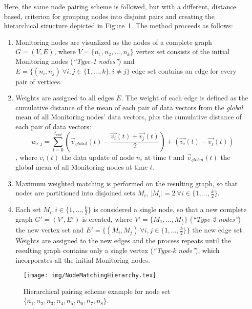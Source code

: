 Here, the same node pairing scheme is followed, but with a different, distance based, criterion for grouping nodes into disjoint pairs and creating the hierarchical structure depicted in Figure~\ref{fig:nodePairHierarchy}. The method proceeds as follows:
\begin{enumerate}
\item Monitoring nodes are visualized as the nodes of a complete graph $G=(V,E)$, where $V=\{n_1, n_2, ... , n_k\}$ vertex set consists of the initial Monitoring nodes (\emph{``Type-1 nodes''}) and $E=\{(n_i, n_j)\ \forall i,j \in \{1, ..., k\}, i \neq j\}$ edge set contains an edge for every pair of vertices.
\item Weights are assigned to all edges $E$. The weight of each edge is defined as the cumulative distance of the mean of each pair of data vectors from the \emph{global} mean of all Monitoring nodes' data vectors, plus the cumulative distance of each pair of data vectors:
\begin{equation}
w_{i,j}=
\sum_{t=0}^{t_{end}}{(\vec{v}_{global}(t)-\frac{\vec{v_i}(t)+\vec{v_j}(t)}{2})+(\vec{v_i}(t)-\vec{v_j}(t))}
\label{form:distanceMatchingWeights}
\end{equation}
, where $v_i(t)$ the data update of node $n_i$ at time $t$ and $\vec{v}_{global}(t)$ the global mean of all Monitoring nodes at time $t$.

\item Maximum weighted matching is performed on the resulting graph, so that nodes are partitioned into disjoined sets $M_i$, $|M_i|=2\ \forall i \in \{1, ..., \frac{k}{2}\}$.
\item Each set $M_i, i \in \{1, ..., \frac{k}{2}\}$ is considered a single node, so that a new complete graph $G'=(V', E')$ is created, where $V'=\{M_1, ..., M_{\frac{k}{2}}\}$ (\emph{``Type-2 nodes''}) the new vertex set and $E'=\{(M_i, M_j)\ \forall i,j \in \{1, ..., \frac{k}{2}\}\}$ the new edge set. Weights are assigned to the new edges and the process repeats until the resulting graph contains only a single vertex (\emph{``Type-k node''}), which incorporates all the initial Monitoring nodes. 
\end{enumerate} 

\begin{figure}
\centering
\texttt{[image: img/NodeMatchingHierarchy.tex]}
\caption{Hierarchical pairing scheme example  for node set $\{n_1, n_2, n_3, n_4, n_5, n_6, n_7, n_8\}$.} 
\label{fig:nodePairHierarchy}
\end{figure}


